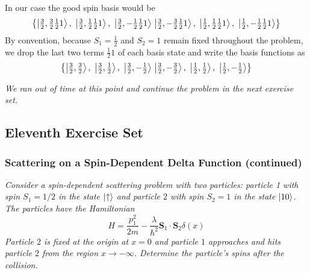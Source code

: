 \documentclass[11pt, a4paper]{article}
\renewcommand{\vec}[1]{\bm{#1}} %
\newcommand{\ua}{\uparrow}  %
\begin{document}
\begin{itemize}
\begin{enumerate}
		In our case the good spin basis would be
		\begin{equation*}
			\left\{ \ket{\tfrac{3}{2}, \tfrac{3}{2} \tfrac{1}{2} 1},\  \ket{\tfrac{3}{2}, \tfrac{1}{2} \tfrac{1}{2} 1},\  \ket{\tfrac{3}{2}, -\tfrac{1}{2} \tfrac{1}{2} 1} \, \ket{\tfrac{3}{2}, -\tfrac{3}{2} \tfrac{1}{2} 1},\ \ket{\tfrac{1}{2}, \tfrac{1}{2} \tfrac{1}{2} 1},\  \ket{\tfrac{1}{2}, -\tfrac{1}{2} \tfrac{1}{2} 1}  \right\}
		\end{equation*}
		By convention, because $ S_{1} = \frac{1}{2} $ and $ S_{2} = 1 $ remain fixed throughout the problem, we drop the last two terms $ \tfrac{1}{2} 1 $ of each basis state and write the basis functions as
		\begin{equation*}
			\left\{ \ket{\tfrac{3}{2}, \tfrac{3}{2} },\  \ket{\tfrac{3}{2}, \tfrac{1}{2} },\  \ket{\tfrac{3}{2}, -\tfrac{1}{2} } \, \ket{\tfrac{3}{2}, -\tfrac{3}{2} },\ \ket{\tfrac{1}{2}, \tfrac{1}{2} },\  \ket{\tfrac{1}{2}, -\tfrac{1}{2}}  \right\}
		\end{equation*}
				
	\end{enumerate}
	\textit{We ran out of time at this point and continue the problem in the next exercise set.}	
\end{itemize}



\subsection{Eleventh Exercise Set}

\subsubsection{Scattering on a Spin-Dependent Delta Function (continued)}
\textit{Consider a spin-dependent scattering problem with two particles: particle 1 with spin $ S_{1} = 1/2 $ in the state $ \ket{\ua} $ and particle $ 2 $ with spin $ S_{2} = 1 $ in the state $ \ket{10} $. The particles have the Hamiltonian}
\begin{equation*}
	H = \frac{p_{1}^{2}}{2m} - \frac{\lambda}{\hbar^{2}}\vec{S}_{1}\cdot \vec{S}_{2}\delta(x)
\end{equation*}
\textit{Particle $ 2 $ is fixed at the origin at $ x = 0 $ and particle $ 1 $ approaches and hits particle $ 2 $ from the region $ x \to -\infty $. Determine the particle's spins after the collision.}
\end{document}
